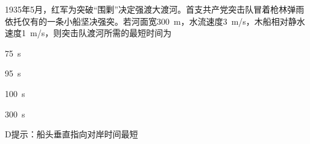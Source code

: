 1935年5月，红军为突破“围剿”决定强渡大渡河。首支共产党突击队冒着枪林弹雨依托仅有的一条小船坚决强突。若河面宽\qty{300}{m}，水流速度\qty{3}{m/s}，木船相对静水速度\qty{1}{m/s}，则突击队渡河所需的最短时间为\paren[]
\begin{choices}
	\item \qty{75}{s}
	\item \qty{95}{s}
	\item \qty{100}{s}
	\item \qty{300}{s}
\end{choices}
\begin{answer}
	D\qquad 提示：船头垂直指向对岸时间最短
\end{answer}
